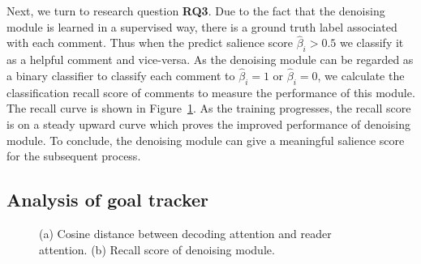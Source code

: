 \documentclass[letterpaper]{article} %
\begin{document}
Next, we turn to research question \textbf{RQ3}.
Due to the fact that the denoising module is learned in a supervised way, there is a ground truth label associated with each comment.
Thus when the predict salience score $\hat{\beta}_i > 0.5$ we classify it as a helpful comment and vice-versa.
As the denoising module can be regarded as a binary classifier to classify each comment to $\hat{\beta}_i = 1$ or $\hat{\beta}_i = 0$, we calculate the classification recall score of comments to measure the performance of this module.
The recall curve is shown in Figure~\ref{fig:subfig}.
As the training progresses, the recall score is on a steady upward curve which proves the improved performance of denoising module.
To conclude, the denoising module can give a meaningful salience score for the subsequent process.

\subsection{Analysis of goal tracker}


\begin{figure}
  \centering
  \caption{(a) Cosine distance between decoding attention and reader attention. (b) Recall score of denoising module.}
  \label{fig:subfig} %
\end{figure}
\end{document}
